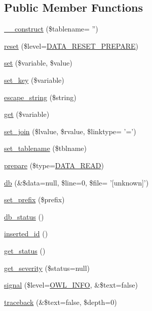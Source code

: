 \subsection*{Public Member Functions}
\begin{DoxyCompactItemize}
\item 
\hyperlink{classDataHandler_a4fd274c45bf06283b05e757b7c081439}{\_\-\_\-construct} (\$tablename= '')
\item 
\hyperlink{classDataHandler_ab89e1aaad9cd0a37f1c7f13c1d9c0d57}{reset} (\$level=\hyperlink{class_8datahandler_8php_a19a99423705b41e563424ae76d7fe184}{DATA\_\-RESET\_\-PREPARE})
\item 
\hyperlink{classDataHandler_a296f26f5af1e46a49ae44110848fa031}{set} (\$variable, \$value)
\item 
\hyperlink{classDataHandler_a32ce223478b78a4ea9838a3c6ac7440c}{set\_\-key} (\$variable)
\item 
\hyperlink{classDataHandler_a435338a167a44a041af2895859abb0c9}{escape\_\-string} (\$string)
\item 
\hyperlink{classDataHandler_a7dcf85dac419f51ad4daa166c928a399}{get} (\$variable)
\item 
\hyperlink{classDataHandler_a9b77733f02e9d6281fc40df110c0ba70}{set\_\-join} (\$lvalue, \$rvalue, \$linktype= '=')
\item 
\hyperlink{classDataHandler_abcb68472abd7da8ee6296421f0a7f2e9}{set\_\-tablename} (\$tblname)
\item 
\hyperlink{classDataHandler_af3e7a17194e97300d499e9178f4913cb}{prepare} (\$type=\hyperlink{class_8datahandler_8php_ac28f74b49007773d24ca2207baac6d32}{DATA\_\-READ})
\item 
\hyperlink{classDataHandler_ad0d98add797178eb7192333dcc2bab4c}{db} (\&\$data=null, \$line=0, \$file= '\mbox{[}unknown\mbox{]}')
\item 
\hyperlink{classDataHandler_a27db6fb8365b7def4db7bd72984a0089}{set\_\-prefix} (\$prefix)
\item 
\hyperlink{classDataHandler_a3c82ec0a40dabcc55dc203c96abf02d2}{db\_\-status} ()
\item 
\hyperlink{classDataHandler_ae025dc51e854e8d5d534c5e26c617470}{inserted\_\-id} ()
\item 
\hyperlink{class__OWL_a99ec771fa2c5c279f80152cc09e489a8}{get\_\-status} ()
\item 
\hyperlink{class__OWL_adf9509ef96858be7bdd9414c5ef129aa}{get\_\-severity} (\$status=null)
\item 
\hyperlink{class__OWL_a51ba4a16409acf2a2f61f286939091a5}{signal} (\$level=\hyperlink{owl_8severitycodes_8php_a139328861128689f2f4def6a399d9057}{OWL\_\-INFO}, \&\$text=false)
\item 
\hyperlink{class__OWL_aa29547995d6741b7d2b90c1d4ea99a13}{traceback} (\&\$text=false, \$depth=0)
\end{DoxyCompactItemize}
